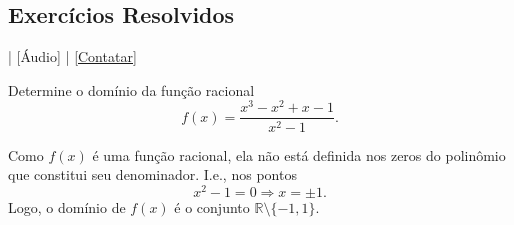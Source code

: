 \subsection*{Exercícios Resolvidos}

\begin{flushright}
  [Vídeo] | [Áudio] | \href{https://phkonzen.github.io/notas/contato.html}{[Contatar]}
\end{flushright}

\begin{exeresol}
  Determine o domínio da função racional
  \begin{equation}
    f(x) = \frac{x^3-x^2+x-1}{x^2-1}.
  \end{equation}
\end{exeresol}
\begin{resol}
  Como $f(x)$ é uma função racional, ela não está definida nos zeros do polinômio que constitui seu denominador. I.e., nos pontos
  \begin{equation}
    x^2-1=0\Rightarrow x = \pm 1.
  \end{equation}
  Logo, o domínio de $f(x)$ é o conjunto $\mathbb{R}\setminus\{-1, 1\}$.
\end{resol}


